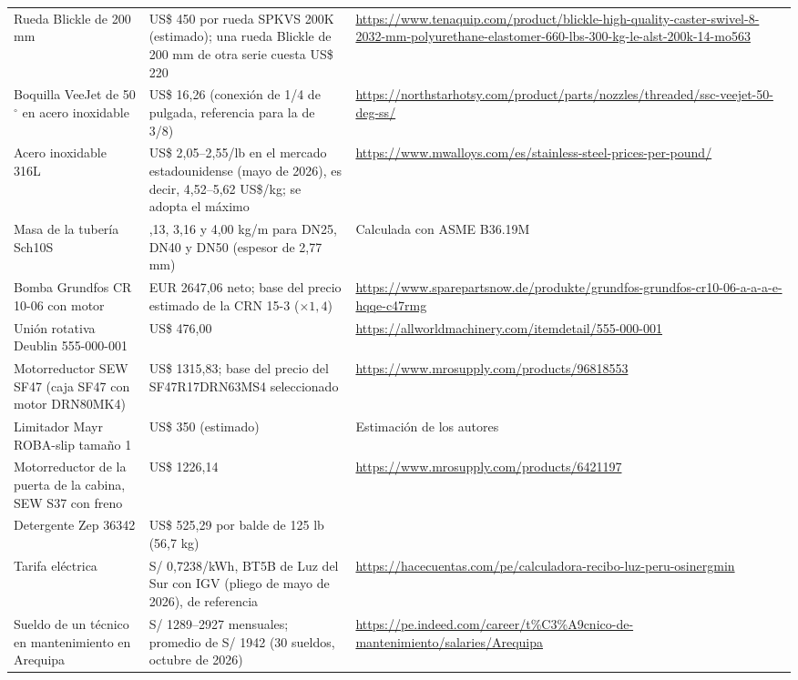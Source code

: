 \begin{longtable}{@{}>{\raggedright\arraybackslash}p{3.3cm}>{\raggedright\arraybackslash}p{4.4cm}>{\raggedright\arraybackslash}p{\dimexpr\textwidth-7.7cm-4\tabcolsep\relax}@{}}
Rueda Blickle de 200 mm & US\$ 450 por rueda SPKVS 200K (estimado); una rueda Blickle de 200 mm de otra serie cuesta US\$ 220 & \url{https://www.tenaquip.com/product/blickle-high-quality-caster-swivel-8-2032-mm-polyurethane-elastomer-660-lbs-300-kg-le-alst-200k-14-mo563}\\
Boquilla VeeJet de 50$^\circ$ en acero inoxidable & US\$ 16,26 (conexión de 1/4 de pulgada, referencia para la de 3/8) & \url{https://northstarhotsy.com/product/parts/nozzles/threaded/ssc-veejet-50-deg-ss/}\\
Acero inoxidable 316L & US\$ 2,05--2,55/lb en el mercado estadounidense (mayo de 2026), es decir, 4,52--5,62 US\$/kg; se adopta el máximo & \url{https://www.mwalloys.com/es/stainless-steel-prices-per-pound/}\\
Masa de la tubería Sch10S & 2,13, 3,16 y 4,00 kg/m para DN25, DN40 y DN50 (espesor de 2,77 mm) & Calculada con ASME B36.19M \cite{asmeb3619}\\
Bomba Grundfos CR 10-06 con motor & EUR 2647,06 neto; base del precio estimado de la CRN 15-3 ($\times1{,}4$) & \url{https://www.sparepartsnow.de/produkte/grundfos-grundfos-cr10-06-a-a-a-e-hqqe-c47rmg}\\
Unión rotativa Deublin 555-000-001 & US\$ 476,00 & \url{https://allworldmachinery.com/itemdetail/555-000-001}\\
Motorreductor SEW SF47 (caja SF47 con motor DRN80MK4) & US\$ 1315,83; base del precio del SF47R17DRN63MS4 seleccionado & \url{https://www.mrosupply.com/products/96818553}\\
Limitador Mayr ROBA-slip tamaño 1 & US\$ 350 (estimado) & Estimación de los autores\\
Motorreductor de la puerta de la cabina, SEW S37 con freno & US\$ 1226,14 & \url{https://www.mrosupply.com/products/6421197}\\
Detergente Zep 36342 & US\$ 525,29 por balde de 125 lb (56,7 kg) & \cite{zep36342}\\
Tarifa eléctrica & S/ 0,7238/kWh, BT5B de Luz del Sur con IGV (pliego de mayo de 2026), de referencia & \url{https://hacecuentas.com/pe/calculadora-recibo-luz-peru-osinergmin}\\
Sueldo de un técnico en mantenimiento en Arequipa & S/ 1289--2927 mensuales; promedio de S/ 1942 (30 sueldos, octubre de 2026) & \url{https://pe.indeed.com/career/t\%C3\%A9cnico-de-mantenimiento/salaries/Arequipa}\\
\end{longtable}
\endgroup
